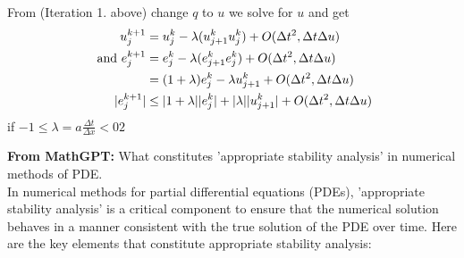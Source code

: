 \documentclass[10pt,a4paper]{report}
\begin{document}
\begin{description}
	From (Iteration 1. above) change $q$ to $u$ we solve for $u$ and get
	\begin{align*}
		u_j^{k+1} &= u_j^k - \lambda(u_{j+1}^ku_j^k) + O(\Delta t^2, \Delta t \Delta u) \\
		\text{ and } e_j^{k+1} &= e_j^k - \lambda(e_{j+1}^ke_j^k) + O(\Delta t^2, \Delta t \Delta u) \\
		&= (1+\lambda)e_j^k - \lambda u_{j+1}^k+ O(\Delta t^2, \Delta t \Delta u) \\
		|e_j^{k+1}| &\le |1+\lambda||e_j^k| + |\lambda||u_{j+1}^k|+ O(\Delta t^2, \Delta t \Delta u)
	\end{align*}if  $-1 \le \lambda = a\frac{\Delta t}{\Delta x} < 02$
	
\end{description}
\HLINE

\textbf{From MathGPT: } What constitutes 'appropriate stability analysis' in numerical methods of PDE.\\


In numerical methods for partial differential equations (PDEs), 'appropriate stability analysis' is a critical component to ensure that the numerical solution behaves in a manner consistent with the true solution of the PDE over time. Here are the key elements that constitute appropriate stability analysis:
\end{document}
